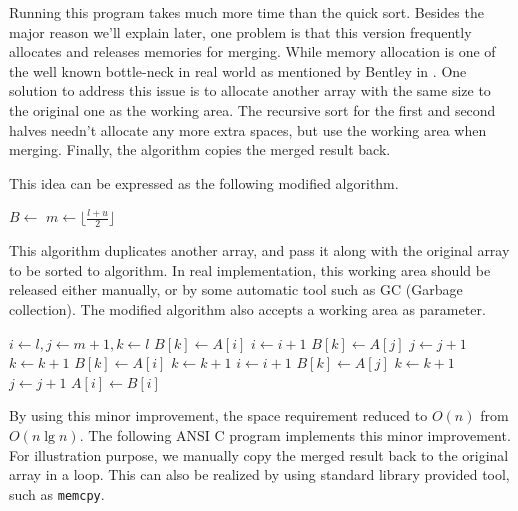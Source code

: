 \documentclass[UTF8]{article}
\begin{document}
Running this program takes much more time than the quick sort. Besides the major reason we'll explain later,
one problem is that this version frequently allocates and releases memories for merging. While memory
allocation is one of the well known bottle-neck in real world as mentioned by Bentley in \cite{pearls}.
One solution to address this issue is to allocate another array with the same size to the original one
as the working area. The recursive sort for the first and second halves needn't allocate any more
extra spaces, but use the working area when merging. Finally, the algorithm copies
the merged result back.

This idea can be expressed as the following modified algorithm.

\begin{algorithmic}[1]
  \State $B \gets $ 
  \State {}
\EndProcedure
\Statex
{}
    \State $m \gets \lfloor \frac{l + u}{2} \rfloor$
    \State {}
    \State {}
    \State {}
  \EndIf
\EndProcedure
\end{algorithmic}

This algorithm duplicates another array, and pass it along with the original array to be sorted
to  algorithm. In real implementation, this working area should be released
either manually, or by some automatic tool such as GC (Garbage collection).
The modified algorithm  also accepts a working area as parameter.

\begin{algorithmic}[1]
  \State $i \gets l, j \gets m + 1, k \gets l$
      \State $B[k] \gets A[i]$
      \State $i \gets i + 1$
    \Else
      \State $B[k] \gets A[j]$
      \State $j \gets j + 1$
    \EndIf
    \State $k \gets k + 1$
  \EndWhile
    \State $B[k] \gets A[i]$
    \State $k \gets k + 1$
    \State $i \gets i + 1$
  \EndWhile
    \State $B[k] \gets A[j]$
    \State $k \gets k + 1$
    \State $j \gets j + 1$
  \EndWhile
   
    \State $A[i] \gets B[i]$
  \EndFor
\EndProcedure
\end{algorithmic}

By using this minor improvement, the space requirement reduced to $O(n)$ from $O(n \lg n)$.
The following ANSI C program implements this minor improvement. For illustration purpose,
we manually copy the merged result back to the original array in a loop. This can also
be realized by using standard library provided tool, such as \verb|memcpy|.
\end{document}
